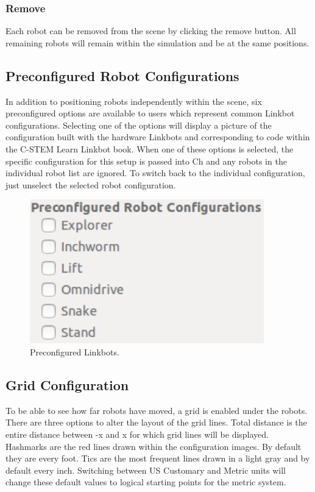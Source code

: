 \documentclass{article}
\begin{document}
\subsubsection{Remove}
Each robot can be removed from the scene by clicking the remove button.  All
remaining robots will remain within the simulation and be at the same positions.

\subsection{Preconfigured Robot Configurations}
In addition to positioning robots independently within the scene, six 
preconfigured options are available to users which represent common Linkbot
configurations.  Selecting one of the options will display a picture of the
configuration built with the hardware Linkbots and corresponding to code within
the C-STEM Learn Linkbot book.  When one of these options is selected, the
specific configuration for this setup is passed into Ch and any robots in the
individual robot list are ignored.  To switch back to the individual
configuration, just unselect the selected robot configuration.
\begin{figure}[H]
	\begin{center}
		\includegraphics[width=4in]{images/preconfig}
	\end{center}
	\caption{Preconfigured Linkbots.}
	\label{fig:preconfig}
\end{figure}

\subsection{Grid Configuration}
To be able to see how far robots have moved, a grid is enabled under the robots.
There are three options to alter the layout of the grid lines.  Total distance
is the entire distance between -x and x for which grid lines will be displayed.
Hashmarks are the red lines drawn within the configuration images.  By default
they are every foot.  Tics are the most frequent lines drawn in a light gray
and by default every inch.  Switching between US Customary and Metric units will
change these default values to logical starting points for the metric system.
\end{document}
